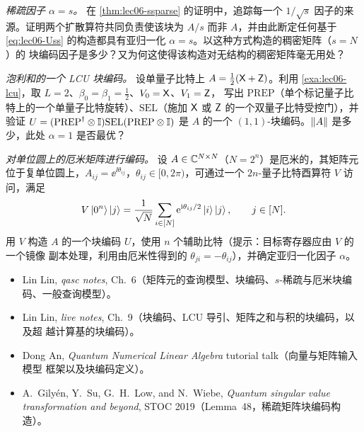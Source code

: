 \begin{exercise}\label{ex:lec06-5}
\emph{稀疏因子 $\alpha=s$。} 在 \cref{thm:lec06-ssparse} 的证明中，追踪每一个 $1/\sqrt s$
因子的来源。证明两个扩散算符共同负责使该块为 $A/s$ 而非 $A$，并由此断定任何基于
\eqref{eq:lec06-Uss} 的构造都具有亚归一化 $\alpha=s$。以这种方式构造的稠密矩阵（$s=N$）的
块编码因子是多少？又为何这使得该构造对无结构的稠密矩阵毫无用处？
\end{exercise}

\begin{exercise}\label{ex:lec06-6}
\emph{泡利和的一个 LCU 块编码。} 设单量子比特上 $A=\tfrac12(\mathsf{X}+\mathsf{Z})$。利用
\cref{exa:lec06-lcu}，取 $L=2$、$\beta_0=\beta_1=\tfrac12$、$V_0=\mathsf{X}$、$V_1=\mathsf{Z}$，
写出 $\mathrm{PREP}$（单个标记量子比特上的一个单量子比特旋转）、$\mathrm{SEL}$（施加
$\mathsf{X}$ 或 $\mathsf{Z}$ 的一个双量子比特受控门），并验证
$U=(\mathrm{PREP}^{\dagger}\otimes\mathbb{I})\mathrm{SEL}(\mathrm{PREP}\otimes\mathbb{I})$ 是 $A$ 的一个
$(1,1)$-块编码。$\left\lVert A \right\rVert$ 是多少，此处 $\alpha=1$ 是否最优？
\end{exercise}

\begin{exercise}\label{ex:lec06-7}
\emph{对单位圆上的厄米矩阵进行编码。} 设 $A\in\mathbb{C}^{N\times N}$（$N=2^n$）是厄米的，其矩阵元
位于复单位圆上，$A_{ij}=\ee^{\ii\theta_{ij}}$，$\theta_{ij}\in[0,2\pi)$，可通过一个
$2n$-量子比特酉算符 $V$ 访问，满足
\[
  V\ket{0^n}\ket{j}=\frac{1}{\sqrt N}\sum_{i\in[N]}\mathrm{e}^{\mathrm{i}\theta_{ij}/2}\ket{i}\ket{j},
  \qquad j\in[N].
\]
用 $V$ 构造 $A$ 的一个块编码 $U$，使用 $n$ 个辅助比特（提示：目标寄存器应由 $V$ 的一个镜像
副本处理，利用由厄米性得到的 $\theta_{ji}=-\theta_{ij}$），并确定亚归一化因子 $\alpha$。
\end{exercise}

\readingsection
\begin{itemize}[leftmargin=1.4em]
  \item Lin Lin, \emph{qasc notes}, Ch.~6（矩阵元的查询模型、块编码、$s$-稀疏与厄米块编
        码、一般查询模型）。
  \item Lin Lin, \emph{live notes}, Ch.~9（块编码、LCU 导引、矩阵之和与积的块编码，以及超
        越计算基的块编码）。
  \item Dong An, \emph{Quantum Numerical Linear Algebra} tutorial talk（向量与矩阵输入模型
        框架以及块编码定义）。
  \item A.~Gily\'en, Y.~Su, G.~H.~Low, and N.~Wiebe, \emph{Quantum singular value
        transformation and beyond}, STOC 2019（Lemma~48，稀疏矩阵块编码构造）。
\end{itemize}
